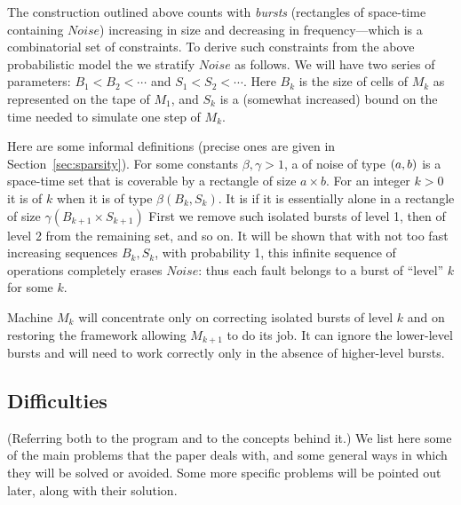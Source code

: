 \documentclass[11pt]{memoir}
\theoremstyle{definition} %
\def\B{B}
\newcommand{\Noise}{\mathit{Noise}}
\renewcommand{\S}{S} %
\begin{document}
The construction outlined above counts with \emph{bursts} (rectangles of space-time
containing  \( \Noise \)) increasing in size and decreasing
in frequency---which is a combinatorial set of constraints.
To derive such constraints from the above probabilistic model
the  we stratify \( \Noise \) as follows.
We will have two series of parameters:  \( \B_{1}<\B_{2}<\dotsm \) and
\( \S_{1}<\S_{2}<\dotsm \).
Here \( \B_{k} \) is the size of cells of \( M_{k} \) as represented on the tape of \( M_{1} \),
and \( \S_{k} \) is a (somewhat increased)
bound on the time needed to simulate one step of  \( M_{k} \).

Here are some informal definitions (precise ones are given in 
Section~\ref{sec:sparsity}).
For some constants \( \beta,\gamma>1 \),
a  of noise of type \( (a,b) \)
is a space-time set that is coverable by a rectangle of size  \( a\times b \).
For an integer \( k>0 \) it is of  \( k \) when it is of type \( \beta(\B_{k},\S_{k}) \).
It is  if it is 
essentially alone in a rectangle of size \( \gamma(\B_{k+1}\times\S_{k+1}) \) 
First we remove such isolated bursts of level 1, then of level 2
from the remaining set, and so on.
It will be shown that with not too fast increasing sequences \( \B_{k},\S_{k} \), with probability 1,
this infinite sequence of operations completely erases \( \Noise \): thus each fault belongs to
a burst of ``level'' \( k \) for some \( k \).

Machine \( M_{k} \) will concentrate only on correcting isolated bursts of level \( k \) and on restoring
the framework allowing \( M_{k+1} \) to do its job.
It can ignore the lower-level bursts and will need to work correctly
only in the absence of higher-level bursts.


\subsection{Difficulties}\label{sec:novelties}

(Referring both to the program and to the concepts behind it.)
We list here some of the main problems that the paper deals with, 
and some general ways in which they will be solved or avoided.
Some more specific problems will be pointed out later, along with their solution.
\end{document}
